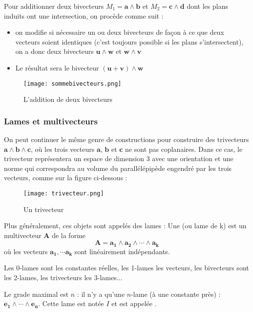Pour additionner deux bivecteurs $M_1 = \bm{a}\wedge\bm{b}$ et $M_2 = \bm{c}\wedge\bm{d}$ dont les plans induits ont une intersection, on procède comme suit :
\begin{itemize}
\item on modifie si nécessaire un ou deux bivecteurs de façon à ce que deux vecteurs soient identiques (c'est toujours possible si les plans s'intersectent), on a donc deux bivecteurs $\bm{u}\wedge\bm{w}$ et $\bm{w}\wedge\bm{v}$
\item Le résultat sera le bivecteur $(\bm{u}+\bm{v})\wedge\bm{w}$
\end{itemize}

\begin{figure}[!ht]
\centering
\texttt{[image: sommebivecteurs.png]}
\caption{L'addition de deux bivecteurs}
\label{sommebivecteurs}
\end{figure}


\subsubsection{Lames et multivecteurs}

On peut continuer le même genre de constructions pour construire des trivecteurs $\bm{a} \wedge \bm{b} \wedge \bm{c}$, où les trois vecteurs $\bm{a}$, $\bm{b}$ et $\bm{c}$ ne sont pas coplanaires. Dans ce cas, le trivecteur représentera un espace de dimension 3 avec une orientation et une norme qui correspondra au volume du parallélépipède engendré par les trois vecteurs, comme sur la figure ci-dessous : 

\begin{figure}[!ht]
\centering
\texttt{[image: trivecteur.png]}
\caption{Un trivecteur}
\label{trivecteur}
\end{figure}

Plus généralement, ces objets sont appelés des lames : Une  (ou lame de  k) est un multivecteur $\bm{A}$ de la forme $$\bm{A} = \bm{a_1}  \wedge \bm{a_2} \wedge \cdots \wedge \bm{a_k}$$ où les vecteurs  $\bm{a_1}, \cdots \bm{a_k}$ sont linéairement indépendants. 


Les 0-lames sont les constantes réelles, les 1-lames les vecteurs, les bivecteurs sont les 2-lames, les trivecteurs les 3-lames... 

Le grade maximal est $n$ : il n'y a qu'une $n$-lame (à une constante près) : $\bm{e_1} \wedge \cdots \wedge \bm{e_n}$. Cette lame est notée $I$ et est appelée .

